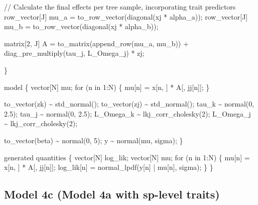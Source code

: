 \documentclass[
  12pt,
  letterpaper,
  DIV=11,
  numbers=noendperiod]{scrartcl}
\newenvironment{Shaded}{\begin{snugshade}}{\end{snugshade}}
\newcommand{\CommentTok}[1]{\textcolor[rgb]{0.37,0.37,0.37}{#1}}
\newcommand{\ControlFlowTok}[1]{\textcolor[rgb]{0.00,0.23,0.31}{#1}}
\newcommand{\DataTypeTok}[1]{\textcolor[rgb]{0.68,0.00,0.00}{#1}}
\newcommand{\DecValTok}[1]{\textcolor[rgb]{0.68,0.00,0.00}{#1}}
\newcommand{\FloatTok}[1]{\textcolor[rgb]{0.68,0.00,0.00}{#1}}
\newcommand{\KeywordTok}[1]{\textcolor[rgb]{0.00,0.23,0.31}{#1}}
\newcommand{\NormalTok}[1]{\textcolor[rgb]{0.00,0.23,0.31}{#1}}
\begin{document}
\begin{Shaded}
\begin{Highlighting}[]
  \CommentTok{// Calculate the final effects per tree sample, incorporating trait predictors}
  \DataTypeTok{row\_vector}\NormalTok{[J] mu\_a = to\_row\_vector(diagonal(xj * alpha\_a));}
  \DataTypeTok{row\_vector}\NormalTok{[J] mu\_b = to\_row\_vector(diagonal(xj * alpha\_b));}

  \DataTypeTok{matrix}\NormalTok{[}\DecValTok{2}\NormalTok{, J] A = to\_matrix(append\_row(mu\_a, mu\_b)) + diag\_pre\_multiply(tau\_j, L\_Omega\_j) * zj;}

\NormalTok{\}}

\KeywordTok{model}\NormalTok{ \{}
  \DataTypeTok{vector}\NormalTok{[N] mu;}
  \ControlFlowTok{for}\NormalTok{ (n }\ControlFlowTok{in} \DecValTok{1}\NormalTok{:N) \{}
\NormalTok{    mu[n] = x[n, ] * A[, jj[n]];}
\NormalTok{  \}}

\NormalTok{  to\_vector(zk) \textasciitilde{} std\_normal();}
\NormalTok{  to\_vector(zj) \textasciitilde{} std\_normal();}
\NormalTok{  tau\_k \textasciitilde{} normal(}\DecValTok{0}\NormalTok{, }\FloatTok{2.5}\NormalTok{);}
\NormalTok{  tau\_j \textasciitilde{} normal(}\DecValTok{0}\NormalTok{, }\FloatTok{2.5}\NormalTok{);}
\NormalTok{  L\_Omega\_k \textasciitilde{} lkj\_corr\_cholesky(}\DecValTok{2}\NormalTok{);}
\NormalTok{  L\_Omega\_j \textasciitilde{} lkj\_corr\_cholesky(}\DecValTok{2}\NormalTok{);}

\NormalTok{  to\_vector(beta) \textasciitilde{} normal(}\DecValTok{0}\NormalTok{, }\DecValTok{5}\NormalTok{);}
\NormalTok{  y \textasciitilde{} normal(mu, sigma);}
\NormalTok{\}}

\KeywordTok{generated quantities}\NormalTok{ \{}
  \DataTypeTok{vector}\NormalTok{[N] log\_lik;}
  \DataTypeTok{vector}\NormalTok{[N] mu;}
  \ControlFlowTok{for}\NormalTok{ (n }\ControlFlowTok{in} \DecValTok{1}\NormalTok{:N) \{}
\NormalTok{    mu[n] = x[n, ] * A[, jj[n]];}
\NormalTok{    log\_lik[n] = normal\_lpdf(y[n] | mu[n], sigma);}
\NormalTok{  \}}
\NormalTok{\}}
\end{Highlighting}
\end{Shaded}

\newpage

\subsection{Model 4c (Model 4a with sp-level
traits)}\label{model-4c-model-4a-with-sp-level-traits}
\end{document}
